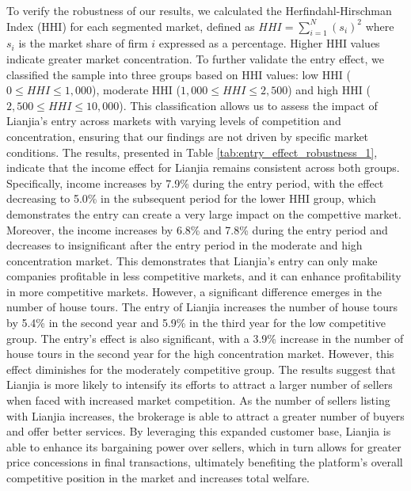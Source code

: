 \documentclass[11pt]{article}
\begin{document}
To verify the robustness of our results, we calculated the Herfindahl-Hirschman Index (HHI) for each segmented market, defined as $HHI = \sum_{i=1}^N (s_i)^2$ where $s_i$ is the market share of firm $i$ expressed as a percentage. Higher HHI values indicate greater market concentration. To further validate the entry effect, we classified the sample into three groups based on HHI values: low HHI ($0 \leq HHI \leq 1,000$), moderate HHI ($1,000 \leq HHI \leq 2,500$) and high HHI ($2,500 \leq HHI \leq 10,000$). This classification allows us to assess the impact of Lianjia's entry across markets with varying levels of competition and concentration, ensuring that our findings are not driven by specific market conditions. The results, presented in Table \ref{tab:entry_effect_robustness_1}, indicate that the income effect for Lianjia remains consistent across both groups. Specifically, income increases by 7.9\% during the entry period, with the effect decreasing to 5.0\% in the subsequent period for the lower HHI group, which demonstrates the entry can create a very large impact on the compettive market. Moreover, the income increases by 6.8\% and 7.8\% during the entry period and decreases to insignificant after the entry period in the moderate and high concentration market. This demonstrates that Lianjia's entry can only make companies profitable in less competitive markets, and it can enhance profitability in more competitive markets. However, a significant difference emerges in the number of house tours. The entry of Lianjia increases the number of house tours by 5.4\% in the second year and 5.9\% in the third year for the low competitive group. The entry's effect is also significant, with a 3.9\% increase in the number of house tours in the second year for the high concentration market. However, this effect diminishes for the moderately competitive group. The results suggest that Lianjia is more likely to intensify its efforts to attract a larger number of sellers when faced with increased market competition. As the number of sellers listing with Lianjia increases, the brokerage is able to attract a greater number of buyers and offer better services. By leveraging this expanded customer base, Lianjia is able to enhance its bargaining power over sellers, which in turn allows for greater price concessions in final transactions, ultimately benefiting the platform's overall competitive position in the market and increases total welfare.
\end{document}
